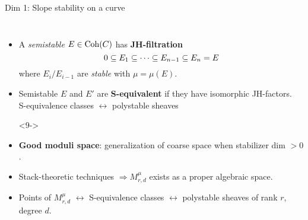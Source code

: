 \documentclass[8pt]{beamer} %
\begin{document}
\begin{frame}[fragile]{Dim 1: Slope stability on a curve}
\begin{columns}[t]
    \begin{itemize}
        \item<7-> A \textit{semistable} $E \in \mathrm{Coh}(C)$ has \textbf{JH-filtration}
        \[ 0 \subseteq E_1 \subseteq \cdots \subseteq E_{n-1} \subseteq E_n = E \]
        where $E_i/E_{i-1}$ are \textit{stable} with $\mu = \mu(E)$.
        \item<8-> Semistable $E$ and $E'$ are \textbf{S-equivalent} if they have isomorphic JH-factors. \\
        S-equivalence classes $\leftrightarrow$ polystable sheaves
        \item[]<9->
        \begin{center}
        \end{center}
        \item<9-> \textbf{Good moduli space}: generalization of coarse space when stabilizer dim $> 0$.
        \item<10-> Stack-theoretic techniques $\Rightarrow M^\mu_{r,d}$ exists as a proper algebraic space.
        \item<10-> Points of $M^\mu_{r,d}$ $\leftrightarrow$ S-equivalence classes $\leftrightarrow$ polystable sheaves of rank $r$, degree $d$.
    \end{itemize}
\end{columns}
\end{frame}
\end{document}
